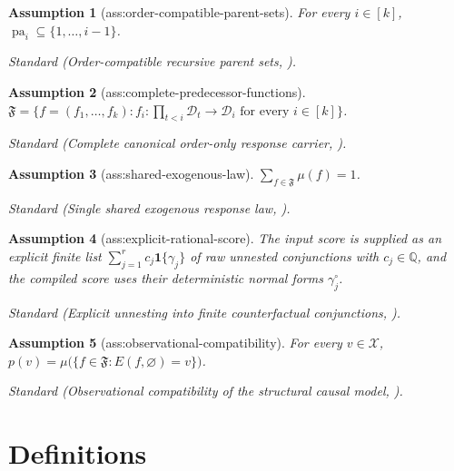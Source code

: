 \documentclass{article}
\newtheorem{assumption}{Assumption}
\begin{document}
\begin{assumption}[ass:order-compatible-parent-sets]\label{ass:order-compatible-parent-sets}
For every \(i\in[k]\), \(\operatorname{pa}_i\subseteq\{1,\ldots,i-1\}\).
\par\smallskip\noindent\emph{Standard} (Order-compatible recursive parent sets, \cite{RossettoAntonucci2026}).
\end{assumption}

\begin{assumption}[ass:complete-predecessor-functions]\label{ass:complete-predecessor-functions}
\(\mathfrak F=\{f=(f_1,\ldots,f_k):f_i:\prod_{t<i}\mathcal D_t\to\mathcal D_i\text{ for every }i\in[k]\}\).
\par\smallskip\noindent\emph{Standard} (Complete canonical order-only response carrier, \cite{RossettoAntonucci2026}).
\end{assumption}

\begin{assumption}[ass:shared-exogenous-law]\label{ass:shared-exogenous-law}
\(\sum_{f\in\mathfrak F}\mu(f)=1\).
\par\smallskip\noindent\emph{Standard} (Single shared exogenous response law, \cite{RossettoAntonucci2026}).
\end{assumption}

\begin{assumption}[ass:explicit-rational-score]\label{ass:explicit-rational-score}
The input score is supplied as an explicit finite list \(\sum_{j=1}^r c_j\mathbf 1\{\gamma_j\}\) of raw unnested conjunctions with \(c_j\in\mathbb Q\), and the compiled score uses their deterministic normal forms \(\gamma_j^{\circ}\).
\par\smallskip\noindent\emph{Standard} (Explicit unnesting into finite counterfactual conjunctions, \cite{RossettoAntonucci2026}).
\end{assumption}

\begin{assumption}[ass:observational-compatibility]\label{ass:observational-compatibility}
For every \(v\in\mathcal X\), \(p(v)=\mu\bigl(\{f\in\mathfrak F:E(f,\varnothing)=v\}\bigr)\).
\par\smallskip\noindent\emph{Standard} (Observational compatibility of the structural causal model, \cite{RossettoAntonucci2026}).
\end{assumption}

\section{Definitions}
\end{document}
